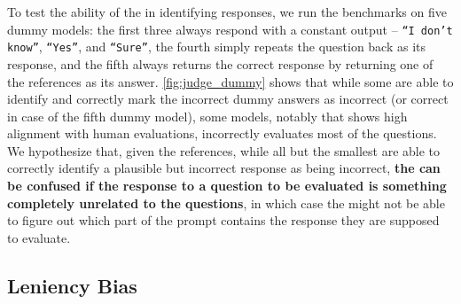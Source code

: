 To test the ability of the \judgemodels in identifying responses, we run the benchmarks on five dummy models: the first three always respond with a constant output -- \texttt{``I don't know''}, \texttt{``Yes''}, and \texttt{``Sure''}, the fourth simply repeats the question back as its response, and the fifth always returns the correct response by returning one of the references as its answer. 
%
\cref{fig:judge_dummy} shows that while some \judgemodels are able to identify and correctly mark the incorrect dummy answers as incorrect (or correct in case of the fifth dummy model), some models, notably  that shows high alignment with human evaluations, incorrectly evaluates most of the questions.
%
We hypothesize that, given the references, while all but the smallest \judgemodels are able to correctly identify a plausible but incorrect response as being incorrect, \textbf{the \judgemodels can be confused if the response to a question to be evaluated is something completely unrelated to the questions}, in which case the \judgemodels might not be able to figure out which part of the prompt contains the response they are supposed to evaluate.



\subsection{Leniency Bias}\label{sec:analysis:quantifyingbias}


